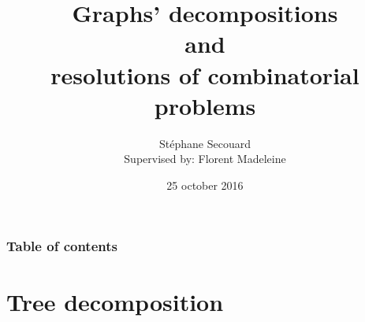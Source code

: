 \documentclass[8pt]{beamer}
\title[Project's name]{Graphs' decompositions\\ and \\ resolutions of combinatorial problems}
\author[My name]{\small {Stéphane Secouard\\ \footnotesize Supervised by: Florent Madeleine}} %
\institute[Caen University]{\textbf {Caen University - Computer science }}
\date{25 october 2016}
\begin{document}
\begin{frame}

  \titlepage
\end{frame}


\begin{frame}

  \frametitle{ \textcolor{green!50!black}{Table of contents}}

  \tableofcontents

\end{frame}








\section{Tree decomposition}
\end{document}
